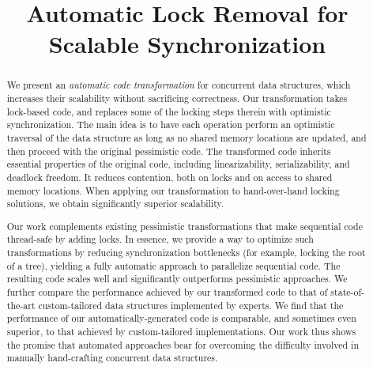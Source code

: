 \documentclass[pldi]{sigplanconf-pldi15}
\newcommand{\doi}[1]{doi:~\href{http://dx.doi.org/#1}{\Hurl{#1}}}   %
\begin{document}
%
%
%
%
%
%


\title{Automatic Lock Removal for Scalable Synchronization}
%

\maketitle

\begin{abstract}
We present an \emph{automatic code transformation} for concurrent data structures, 
which increases their scalability without sacrificing correctness. 
Our transformation takes lock-based code, and replaces some of the 
locking steps therein with optimistic synchronization. The main idea is to
have each operation perform an optimistic traversal of the data structure 
as long as no shared memory locations are updated, and then proceed with
the original pessimistic code. The transformed code inherits essential 
properties of the original code, including linearizability, serializability,
and deadlock freedom. It reduces contention, both on locks and on access
to shared memory locations. When applying our transformation to 
hand-over-hand locking solutions, we obtain significantly superior scalability.  

Our work complements existing pessimistic transformations that make
sequential code thread-safe by adding locks.
In essence, we provide a way to optimize such transformations by reducing 
synchronization bottlenecks (for example, locking the root of a tree), 
yielding a fully automatic approach to parallelize sequential code. 
The resulting code scales well and significantly outperforms
pessimistic approaches. We further compare the performance 
achieved by our transformed code to that of state-of-the-art 
custom-tailored data structures implemented by experts. 
We find that the performance of our automatically-generated 
code is comparable, and sometimes even superior, 
to that achieved by custom-tailored implementations.
Our work thus shows the promise that automated approaches
bear for overcoming the difficulty involved in manually
hand-crafting concurrent data structures.

\end{abstract}
\end{document}
